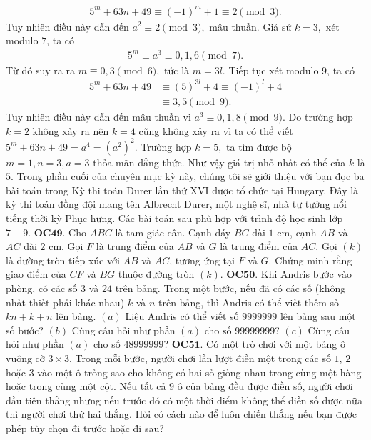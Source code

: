 \begin{multicols}{2}
\begin{align*}
		5^m+63n+49 \equiv (-1)^{m}+1  \equiv 2 \pmod{3}.
	\end{align*}
	Tuy nhiên điều này dẫn đến $a^2\equiv 2 \pmod{3},$ mâu thuẫn.  
	\vskip 0.1cm
	Giả sử $k=3,$ xét modulo $7$, ta có
	\begin{align*}
		5^m \equiv a^3 \equiv 0,1,6 \pmod{7}.
	\end{align*}
	Từ đó suy ra ra $m \equiv 0,3 \pmod{6},$ tức là $m=3l.$
	\vskip 0.1cm
	Tiếp tục xét modulo $9$, ta có 
	\begin{align*}
		5^m+63n+49 &\equiv (5)^{3l}+4  \equiv (-1)^l +4\\
		&\equiv 3, 5 \pmod{9}.
	\end{align*}
	Tuy nhiên điều này dẫn đến mâu thuẫn vì $a^3\equiv 0, 1, 8 \pmod{9}.$
	\vskip 0.1cm
	Do trường hợp $k=2$ không xảy ra nên $k=4$ cũng không xảy ra vì ta có thể viết $5^m+63n+49=a^4=(a^2)^2.$
	\vskip 0.1cm
	Trường hợp $k=5,$ ta tìm được bộ $m=1, n=3, a=3$ thỏa mãn đẳng thức. Như vậy giá trị nhỏ nhất có thể của $k$ là $5$.
	\vskip 0.1cm
	Trong phần cuối của chuyên mục kỳ này, chúng tôi sẽ giới thiệu với bạn đọc ba bài toán trong Kỳ thi toán Durer lần thứ XVI được tổ chức tại Hungary. Đây là kỳ thi toán đồng đội mang tên Albrecht Durer, một nghệ sĩ, nhà tư tưởng nổi tiếng thời kỳ Phục hưng. Các bài toán sau phù hợp với trình độ học sinh lớp $7-9$.
	\vskip 0.1cm
	{\bf\color{cackithi} OC$\pmb{49.}$} Cho $ABC$ là tam giác cân. Cạnh đáy $BC$ dài $1$ cm, cạnh $AB$ và $AC$ dài $2$ cm. Gọi $F$ là trung điểm của $AB$ và $G$ là trung điểm của $AC.$ Gọi $(k)$ là đường tròn tiếp xúc với $AB$ và $AC$, tương ứng tại $F$ và $G$. Chứng minh rằng giao điểm của $CF$ và $BG$ thuộc đường tròn $(k).$
	\vskip 0.1cm
	{\bf\color{cackithi} OC$\pmb{50.}$} Khi Andris bước vào phòng, có các số $3$ và $24$ trên bảng. Trong một bước, nếu đã có các số (không nhất thiết phải khác nhau) $k$ và $n$ trên bảng, thì
	Andris có thể viết thêm số $kn + k + n$ lên bảng. 
	\vskip 0.1cm
	$(a)$ Liệu Andris có thể viết số  $9999999$ lên bảng sau một số bước?
	\vskip 0.1cm
	$(b)$ Cùng câu hỏi như phần $(a)$ cho số $99999999$?
	\vskip 0.1cm
	$(c)$ Cùng câu hỏi như phần $(a)$ cho số $48999999$?
	\vskip 0.1cm
	{\bf\color{cackithi} OC$\pmb{51.}$} Có một trò chơi với một bảng ô vuông cỡ $3 \times 3$. Trong mỗi bước, người chơi lần lượt điền một trong các số $1$, $2$ hoặc $3$ vào một ô trống sao cho không có hai số giống nhau trong cùng một hàng hoặc trong cùng một cột. Nếu tất cả $9$ ô của bảng đều được điền số, người chơi đầu tiên thắng nhưng nếu trước đó có một thời điểm không thể điền số được nữa thì người chơi thứ hai thắng.
	\vskip 0.1cm
	Hỏi có cách nào để luôn chiến thắng nếu bạn được phép tùy chọn đi trước hoặc đi sau?
\end{multicols}